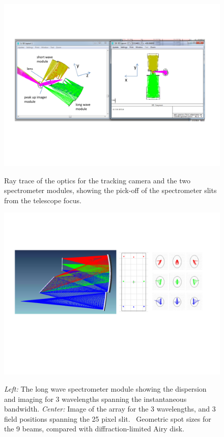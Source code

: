 \begin{figure}[t]
\vspace{0.35in}
  \begin{center}
    \includegraphics[width=6.5in]{tracking_camera_placeholder.pdf}
    \captionbaseline\caption{\small Ray trace of the optics for the tracking camera and the two spectrometer modules, showing the pick-off of the spectrometer slits from the telescope focus.}
    \linefig\label{fig:TrackingCamera}
  \end{center}
\end{figure}

\begin{figure}[t]
\vspace{0.35in}
  \begin{center}
    \includegraphics[width=6.5in]{starfire_spectrometer.pdf}
    \captionbaseline\caption{\small {\it Left:} The long wave spectrometer module showing the dispersion and imaging for 3 wavelengths spanning the instantaneous bandwidth. {\it Center:} Image of the array for the 3 wavelengths, and 3 field positions spanning the 25 pixel slit. \R\ Geometric spot sizes for the 9 beams, compared with diffraction-limited Airy disk.}
    \linefig\label{fig:SpectrometerModule}
  \end{center}
\end{figure}

